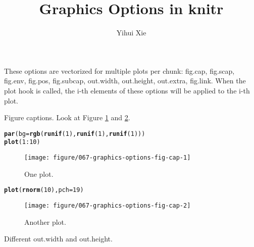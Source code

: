 \documentclass{article}\usepackage[]{graphicx}\usepackage[]{color}
\title{Graphics Options in knitr}
\author{Yihui Xie}
\makeatletter
\newcommand{\hlnum}[1]{\textcolor[rgb]{0.686,0.059,0.569}{#1}}%
\newcommand{\hlopt}[1]{\textcolor[rgb]{0,0,0}{#1}}%
\newcommand{\hlstd}[1]{\textcolor[rgb]{0.345,0.345,0.345}{#1}}%
\newcommand{\hlkwc}[1]{\textcolor[rgb]{0.333,0.667,0.333}{#1}}%
\newcommand{\hlkwd}[1]{\textcolor[rgb]{0.737,0.353,0.396}{\textbf{#1}}}%
\newenvironment{kframe}{%
 \def\at@end@of@kframe{}%
 \ifinner\ifhmode%
  \def\at@end@of@kframe{\end{minipage}}%
  \begin{minipage}{\columnwidth}%
 \fi\fi%
 \def\FrameCommand##1{\hskip\@totalleftmargin \hskip-\fboxsep
 \colorbox{shadecolor}{##1}\hskip-\fboxsep
     \hskip-\linewidth \hskip-\@totalleftmargin \hskip\columnwidth}%
 \MakeFramed {\advance\hsize-\width
   \@totalleftmargin\z@ \linewidth\hsize
   \@setminipage}}%
 {\par\unskip\endMakeFramed%
 \at@end@of@kframe}
\newenvironment{knitrout}{}{} %
\makeatother
\begin{document}
\maketitle



These options are vectorized for multiple plots per chunk: fig.cap, fig.scap, fig.env, fig.pos, fig.subcap, out.width, out.height, out.extra, fig.link.
When the plot hook is called, the i-th elements of these options will be
applied to the i-th plot.

Figure captions. Look at Figure \ref{fig:fig-cap1} and \ref{fig:fig-cap2}.

\begin{knitrout}
\color{fgcolor}\begin{kframe}
\begin{alltt}
\hlkwd{par}\hlstd{(}\hlkwc{bg} \hlstd{=} \hlkwd{rgb}\hlstd{(}\hlkwd{runif}\hlstd{(}\hlnum{1}\hlstd{),} \hlkwd{runif}\hlstd{(}\hlnum{1}\hlstd{),} \hlkwd{runif}\hlstd{(}\hlnum{1}\hlstd{)))}
\hlkwd{plot}\hlstd{(}\hlnum{1}\hlopt{:}\hlnum{10}\hlstd{)}
\end{alltt}
\end{kframe}\begin{figure}[H]
\texttt{[image: figure/067-graphics-options-fig-cap-1]} \caption[One plot]{One plot.}\label{fig:fig-cap1}
\end{figure}

\begin{kframe}\begin{alltt}
\hlkwd{plot}\hlstd{(}\hlkwd{rnorm}\hlstd{(}\hlnum{10}\hlstd{),} \hlkwc{pch} \hlstd{=} \hlnum{19}\hlstd{)}
\end{alltt}
\end{kframe}\begin{figure}[H]
\texttt{[image: figure/067-graphics-options-fig-cap-2]} \caption[Another plot]{Another plot.}\label{fig:fig-cap2}
\end{figure}


\end{knitrout}

Different out.width and out.height.
\end{document}

